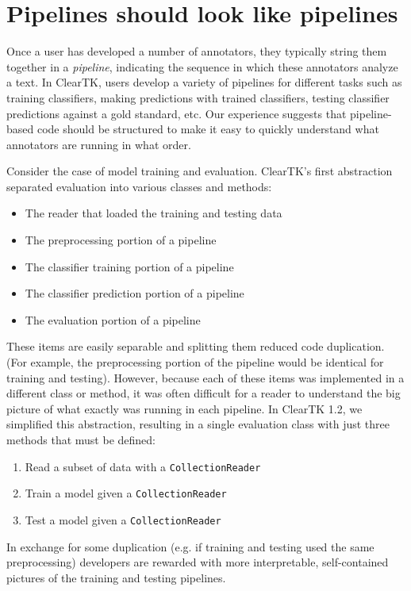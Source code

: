 \documentclass[10pt, a4paper]{article}
\newcommand{\code}[1]{\texttt{\small #1}}
\begin{document}

\section{Pipelines should look like pipelines}
Once a user has developed a number of annotators, they typically string them together in a \emph{pipeline}, indicating the sequence in which these annotators analyze a text.
In ClearTK, users develop a variety of pipelines for different tasks such as training classifiers, making predictions with trained classifiers, testing classifier predictions against a gold standard, etc.  Our experience suggests that pipeline-based code should be structured to make it easy to quickly understand what annotators are running in what order.

Consider the case of model training and evaluation.
ClearTK's first abstraction separated evaluation into various classes and methods:
\begin{itemize}
\item The reader that loaded the training and testing data
\item The preprocessing portion of a pipeline
\item The classifier training portion of a pipeline
\item The classifier prediction portion of a pipeline
\item The evaluation portion of a pipeline
\end{itemize}
These items are easily separable and splitting them reduced code duplication. (For example, the preprocessing portion of the pipeline would be identical for training and testing).
However, because each of these items was implemented in a different class or method, it was often difficult for a reader to understand the big picture of what exactly was running in each pipeline.
In ClearTK 1.2, we simplified this abstraction, resulting in a single evaluation class with just three methods that must be defined:
\begin{enumerate}
\item Read a subset of data with a \code{CollectionReader}
\item Train a model given a \code{CollectionReader}
\item Test a model given a \code{CollectionReader}
\end{enumerate}
In exchange for some duplication (e.g. if training and testing used the same preprocessing) developers are rewarded with more interpretable, self-contained pictures of the training and testing pipelines.
\end{document}
